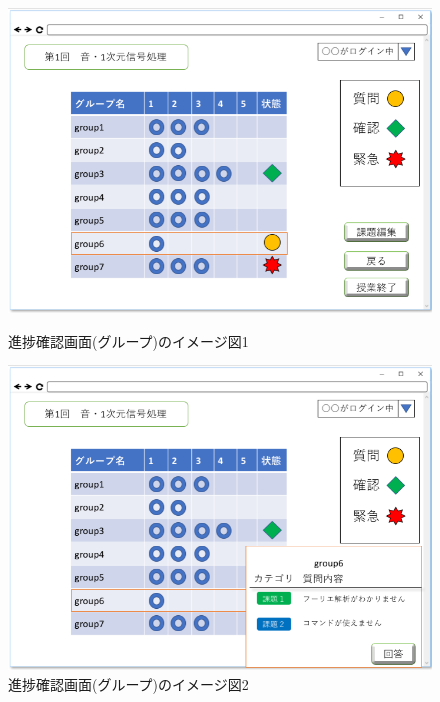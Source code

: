 \begin{figure}[htbp]
 \begin{minipage}{0.5\hsize}
  \begin{center}
   \includegraphics[width=1\linewidth,clip]{./img/20.png}
  \end{center}
  \caption{進捗確認画面(グループ)のイメージ図1}\label{fig:20}
 \end{minipage}
 \begin{minipage}{0.5\hsize}
  \begin{center}
   \includegraphics[width=1\linewidth,clip]{./img/21.png}
  \end{center}
  \caption{進捗確認画面(グループ)のイメージ図2}\label{fig:21}
 \end{minipage}
\end{figure}


